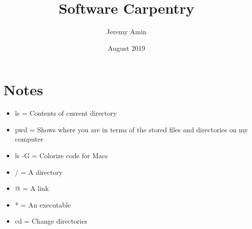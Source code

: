 \documentclass{article}
\title{Software Carpentry}
\author{Jeremy Amin}
\date{August 2019}
\begin{document}
\maketitle

\section{Notes}

\begin{itemize}
    \item ls = Contents of current directory
    \item pwd = Shows where you are in terms of the stored files and directories on my computer
    \item ls -G = Colorize code for Macs
    \item / = A directory
    \item @ = A link
    \item * = An executable
    \item cd = Change directories
\end{itemize}
\end{document}
